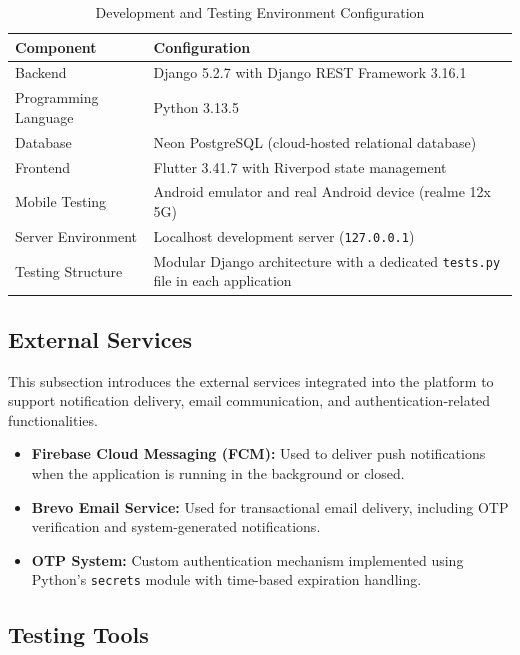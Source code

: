 \begin{table}[H]
\centering
\caption{Development and Testing Environment Configuration}
\label{tab:environment_config}
\renewcommand{\arraystretch}{1.3}
\begin{tabular}{|p{3cm}|p{11cm}|}
\hline
\textbf{Component} & \textbf{Configuration} \\
\hline
Backend & Django 5.2.7 with Django REST Framework 3.16.1 \\
\hline
Programming Language & Python 3.13.5 \\
\hline
Database & Neon PostgreSQL (cloud-hosted relational database) \\
\hline
Frontend & Flutter 3.41.7 with Riverpod state management \\
\hline
Mobile Testing & Android emulator and real Android device (realme 12x 5G) \\
\hline
Server Environment & Localhost development server (\texttt{127.0.0.1}) \\
\hline
Testing Structure & Modular Django architecture with a dedicated \texttt{tests.py} file in each application \\
\hline
\end{tabular}
\end{table}

\subsection{External Services}
This subsection introduces the external services integrated into the platform to support notification delivery, email communication, and authentication-related functionalities.

\begin{itemize}
    \item \textbf{Firebase Cloud Messaging (FCM):} Used to deliver push notifications when the application is running in the background or closed.

    \item \textbf{Brevo Email Service:} Used for transactional email delivery, including OTP verification and system-generated notifications.

    \item \textbf{OTP System:} Custom authentication mechanism implemented using Python's \texttt{secrets} module with time-based expiration handling.
\end{itemize}

\subsection{Testing Tools}

